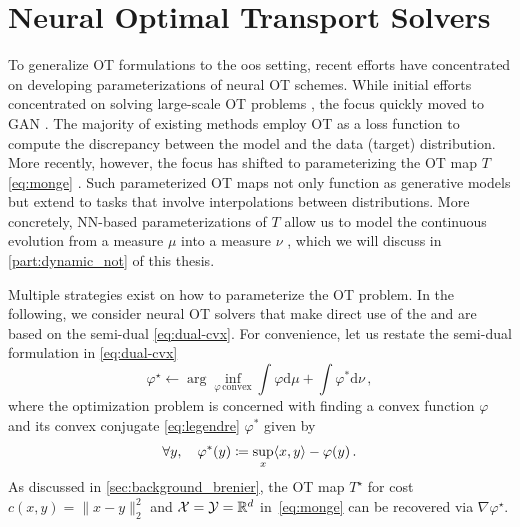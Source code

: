 \section{Neural Optimal Transport Solvers} \label{sec:neural_solvers}

To generalize \acrlong{OT} formulations to the \acrlong{oos} setting, recent efforts have concentrated on developing parameterizations of neural \acrlong{OT} schemes.
While initial efforts concentrated on solving large-scale \acrshort{OT} problems \citep{seguy2018large}, the focus quickly moved to \acrfull{GAN} \citep{arjovsky2017wasserstein, genevay2018learning}.
The majority of existing methods employ \acrshort{OT} as a loss function to compute the discrepancy between the model and the data (target) distribution. 
More recently, however, the focus has shifted to parameterizing the \acrshort{OT} map $T$ \eqref{eq:monge} \citep{yang2018scalable, rout2021generative, daniels2021score}. Such parameterized \acrshort{OT} maps not only function as generative models but extend to tasks that involve interpolations between distributions. More concretely, \acrlong{NN}-based parameterizations of $T$ allow us to model the continuous evolution from a measure $\mu$ into a measure $\nu$ \citep{tong2020trajectorynet}, which we will discuss in \cref{part:dynamic_not} of this thesis.

Multiple strategies exist on how to parameterize the \acrlong{OT} problem.
In the following, we consider neural \acrshort{OT} solvers that make direct use of the  and are based on the semi-dual \eqref{eq:dual-cvx}.
For convenience, let us restate the semi-dual formulation in \eqref{eq:dual-cvx}
\begin{equation*}
	\varphi^\star \leftarrow \arg\inf_{\varphi\, \text{convex}} \int \varphi \textrm{d}\mu + \int \varphi^*\textrm{d}\nu\,,
\end{equation*}
where the optimization problem is concerned with finding a convex function $\varphi$ and its convex conjugate \eqref{eq:legendre} $\varphi^*$ given by
\begin{equation} \label{eq:varphi_conjugate}
	\forall y, \quad \varphi^*(y) \coloneqq \sup _x \langle x, y\rangle-\varphi(y)\,.	
\end{equation}
As discussed in \cref{sec:background_brenier}, the \acrlong{OT} map $T^\star$ for cost $c(x,y) = \|x-y\|^2_2$ and ${\mathcal{X}} = {\mathcal{Y}} = \mathbb{R}^d$ in~\eqref{eq:monge} can be recovered via $\nabla \varphi^\star$.

